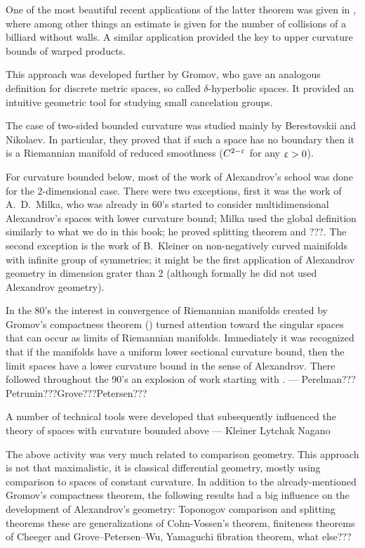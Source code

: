 One of the most beautiful recent applications of the latter theorem was given in \cite{BFK},
where among other things an estimate is given for the number of collisions of a billiard without walls.   
A similar application provided the key to upper curvature bounds of warped products.

This approach was developed further by Gromov, who gave an analogous definition for discrete metric spaces, so called $\delta$-hyperbolic spaces. 
It provided an intuitive geometric tool for studying small cancelation groups.

The case of two-sided bounded curvature was studied mainly by Berestovskii and Nikolaev.
In particular, they proved that if such a space has no boundary then it is a Riemannian manifold of reduced smoothness ($C^{2-\upvarepsilon}$ for any $\upvarepsilon>0$).

For curvature bounded below, 
most of the work of Alexandrov's school was done for the 2-dimensional case.
There were two exceptions,
first it was the work of A.~D.~Milka, 
who was already in 60's started to consider multidimensional Alexandrov's spaces with lower curvature bound;
Milka used the global definition similarly to what we do in this book;
he proved splitting theorem and ???.
The second exception is the work of B.~Kleiner on non-negatively curved mainifolds with infinite group of symmetries;
it might be the first application of Alexandrov geometry in dimension grater than 2
(although
formally he did not used Alexandrov geometry).



In the 80's the interest in convergence of Riemannian manifolds created by Gromov's compactness theorem (\cite{gomov-precompactness}) turned attention toward the singular spaces that can occur as limits of Riemannian manifolds. 
Immediately it was recognized that if the manifolds have a uniform lower sectional curvature bound, then the limit spaces have a lower curvature bound in the sense of Alexandrov. 
There followed throughout the 90's an explosion of work starting with \cite{BGP}.
--- Perelman???Petrunin???Grove???Petersen???

A number of technical tools were developed that subsequently influenced the theory of spaces with curvature bounded above --- Kleiner Lytchak Nagano

The above activity was very much related to comparison geometry.
This approach is not that maximalistic, it is classical differential geometry, 
mostly using comparison  to spaces of constant curvature.
In addition to the already-mentioned Gromov's compactness theorem,
the following results had a big influence on the development of Alexandrov's geometry:
Toponogov comparison and splitting theorems
these are generalizations of Cohn-Vossen's theorem, 
finiteness theorems of
Cheeger and
Grove--Petersen--Wu, 
Yamaguchi fibration theorem,
what else???



